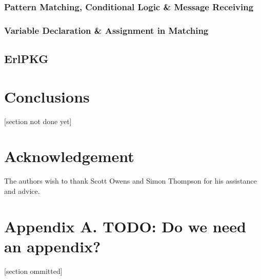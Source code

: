 \documentclass[twoside,12pt,titlepage,a4paper]{article}
\begin{document}
	
\subsubsection{Pattern Matching, Conditional Logic \& Message Receiving}
\subsubsection{Variable Declaration \& Assignment in Matching}
\subsection{ErlPKG}

\section{Conclusions}
\label{Conclusions}

 [section not done yet]

\section{Acknowledgement}
The authors wish to thank Scott Owens and Simon Thompson for his assistance and advice.

\appendix
\section*{Appendix A. TODO: Do we need an appendix?}


[section ommitted]



\vskip 0.2in


\end{document}
